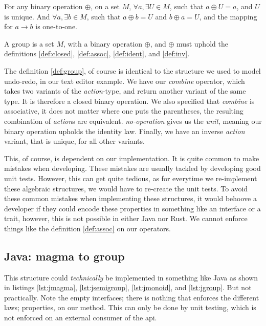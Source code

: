 \begin{definition} \label{def:inv}
  For any binary operation $\oplus$, on a set $M$,
  $\forall a, \exists U \in M$, such that
  $a \oplus U = a$, and $U$ is unique.
  And $\forall a, \exists b \in M$, such that $a \oplus b = U$ and
  $b \oplus a = U$, and the mapping for $a \to b$ is one-to-one.
\end{definition}

\begin{definition}[Group] \label{def:group}
  A group is a set $M$, with a binary operation $\oplus$, and $\oplus$ must
  uphold the definitions \ref{def:closed}, \ref{def:assoc}, \ref{def:ident},
  and \ref{def:inv}.
\end{definition}

The definition \ref{def:group}, of course is identical to the structure we used
to model undo-redo, in our text editor example. We have our \textit{combine}
operator, which takes two variants of the \textit{action}-type, and return
another variant of the same type. It is therefore a closed binary operation. We
also specified that \textit{combine} is associative, it does not matter where one
puts the parentheses, the resulting combination of \textit{action}s are
equivalent. \textit{no-operation} gives us the \textit{unit}, meaning our binary
operation upholds the identity law. Finally, we have an inverse \textit{action}
variant, that is unique, for all other variants.

This, of course, is dependent on our implementation. It is quite common to make
mistakes when developing. These mistakes are usually tackled by developing good
unit tests. However, this can get quite tedious, as for everytime we re-implement
these algebraic structures, we would have to re-create the unit tests. To avoid
these common mistakes when implementing these structures, it would behoove a
developer if they could encode these properties in something like an interface or
a trait, however, this is not possible in either Java nor Rust. We cannot enforce
things like the definition \ref{def:assoc} on our operators.

\subsection{Java: magma to group}

This structure could \textit{technically} be implemented in something like Java
as shown in listings \ref{lst:jmagma}, \ref{lst:jsemigroup}, \ref{lst:jmonoid},
and \ref{lst:jgroup}. But not practically. Note the empty interfaces; there is
nothing that enforces the different laws; properties, on our method. This can
only be done by unit testing, which is not enforced on an external consumer of
the \gls*{api}.

